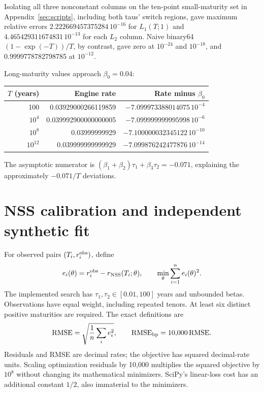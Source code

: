 \documentclass[12pt,a4paper]{article}
\newcommand{\bp}{\mathrm{bp}}
\begin{document}
Isolating all three nonconstant columns on the ten-point small-maturity
set in Appendix~\ref{sec:scripts}, including both taus' switch regions,
gave maximum relative errors $2.222669457375284\,10^{-16}$ for $L_1(T;1)$
and $4.465429311674831\,10^{-13}$ for each $L_2$ column.
Naive binary64 $(1-\exp(-T))/T$, by contrast, gave zero at $10^{-24}$
and $10^{-18}$, and 0.9999778782798785 at $10^{-12}$.

Long-maturity values approach $\beta_0=0.04$:
\begin{center}\small
\begin{tabular}{@{}rrr@{}}
\toprule
$T$ (years) & Engine rate & Rate minus $\beta_0$\\
\midrule
100 & 0.03929000266119859 & $-7.099973388014075\,10^{-4}$\\
$10^4$ & 0.039992900000000005 & $-7.099999999995998\,10^{-6}$\\
$10^8$ & 0.03999999929 & $-7.100000032345122\,10^{-10}$\\
$10^{12}$ & 0.039999999999929 & $-7.099876242477876\,10^{-14}$\\
\bottomrule
\end{tabular}
\end{center}
The asymptotic numerator is
$(\beta_1+\beta_2)\tau_1+\beta_3\tau_2=-0.071$, explaining
the approximately $-0.071/T$ deviations.

\section{NSS calibration and independent synthetic fit}
For observed pairs $(T_i,r_i^{\rm obs})$, define
\begin{equation}
 e_i(\theta)=r_i^{\rm obs}-r_{\rm NSS}(T_i;\theta),\qquad
 \min_\theta\sum_{i=1}^{n}e_i(\theta)^2.
\end{equation}
The implemented search has $\tau_1,\tau_2\in[0.01,100]$ years and
unbounded betas. Observations have equal weight, including repeated tenors.
At least six distinct positive maturities are required. The exact definitions are
\begin{equation}
 {\rm RMSE}=\sqrt{\frac1n\sum_i e_i^2},\qquad
 {\rm RMSE}_{\bp}=10{,}000\,{\rm RMSE}.
\end{equation}
Residuals and RMSE are decimal rates; the objective has squared decimal-rate
units. Scaling optimization residuals by 10,000 multiplies the squared
objective by $10^8$ without changing its mathematical minimizers.
SciPy's linear-loss cost has an additional constant $1/2$, also immaterial
to the minimizers.
\end{document}

